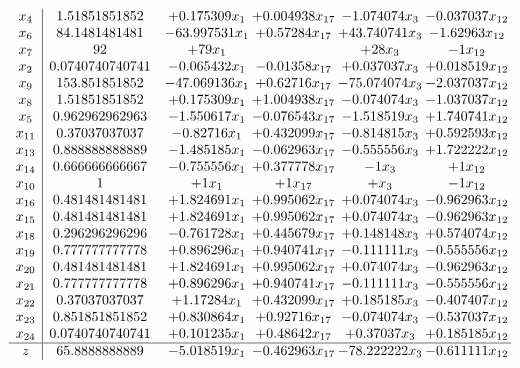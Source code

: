 \documentclass[11pt]{article}
\begin{document}
\[\begin{array}{c| c c@{\hskip 2pt} c@{\hskip 2pt} c@{\hskip 2pt} c@{\hskip 2pt} }
 x_{4}   &  1.51851851852 & + 0.175309 x_{1} & + 0.004938 x_{17} & -1.074074 x_{3} & -0.037037 x_{12}\\
 x_{6}   &  84.1481481481 & -63.997531 x_{1} & + 0.57284 x_{17} & + 43.740741 x_{3} & -1.62963 x_{12}\\
 x_{7}   &  92 & + 79 x_{1} &   & + 28 x_{3} & -1 x_{12}\\
 x_{2}   &  0.0740740740741 & -0.065432 x_{1} & -0.01358 x_{17} & + 0.037037 x_{3} & + 0.018519 x_{12}\\
 x_{9}   &  153.851851852 & -47.069136 x_{1} & + 0.62716 x_{17} & -75.074074 x_{3} & -2.037037 x_{12}\\
 x_{8}   &  1.51851851852 & + 0.175309 x_{1} & + 1.004938 x_{17} & -0.074074 x_{3} & -1.037037 x_{12}\\
 x_{5}   &  0.962962962963 & -1.550617 x_{1} & -0.076543 x_{17} & -1.518519 x_{3} & + 1.740741 x_{12}\\
 x_{11}   &  0.37037037037 & -0.82716 x_{1} & + 0.432099 x_{17} & -0.814815 x_{3} & + 0.592593 x_{12}\\
 x_{13}   &  0.888888888889 & -1.485185 x_{1} & -0.062963 x_{17} & -0.555556 x_{3} & + 1.722222 x_{12}\\
 x_{14}   &  0.666666666667 & -0.755556 x_{1} & + 0.377778 x_{17} & -1 x_{3} & + 1 x_{12}\\
 x_{10}   &  1 & + 1 x_{1} & + 1 x_{17} & +  x_{3} & -1 x_{12}\\
 x_{16}   &  0.481481481481 & + 1.824691 x_{1} & + 0.995062 x_{17} & + 0.074074 x_{3} & -0.962963 x_{12}\\
 x_{15}   &  0.481481481481 & + 1.824691 x_{1} & + 0.995062 x_{17} & + 0.074074 x_{3} & -0.962963 x_{12}\\
 x_{18}   &  0.296296296296 & -0.761728 x_{1} & + 0.445679 x_{17} & + 0.148148 x_{3} & + 0.574074 x_{12}\\
 x_{19}   &  0.777777777778 & + 0.896296 x_{1} & + 0.940741 x_{17} & -0.111111 x_{3} & -0.555556 x_{12}\\
 x_{20}   &  0.481481481481 & + 1.824691 x_{1} & + 0.995062 x_{17} & + 0.074074 x_{3} & -0.962963 x_{12}\\
 x_{21}   &  0.777777777778 & + 0.896296 x_{1} & + 0.940741 x_{17} & -0.111111 x_{3} & -0.555556 x_{12}\\
 x_{22}   &  0.37037037037 & + 1.17284 x_{1} & + 0.432099 x_{17} & + 0.185185 x_{3} & -0.407407 x_{12}\\
 x_{23}   &  0.851851851852 & + 0.830864 x_{1} & + 0.92716 x_{17} & -0.074074 x_{3} & -0.537037 x_{12}\\
 x_{24}   &  0.0740740740741 & + 0.101235 x_{1} & + 0.48642 x_{17} & + 0.37037 x_{3} & + 0.185185 x_{12}\\
\hline
z    &  65.8888888889 & -5.018519 x_{1} & -0.462963 x_{17} & -78.222222 x_{3} & -0.611111 x_{12}\\
\end{array}\]
\end{document}
